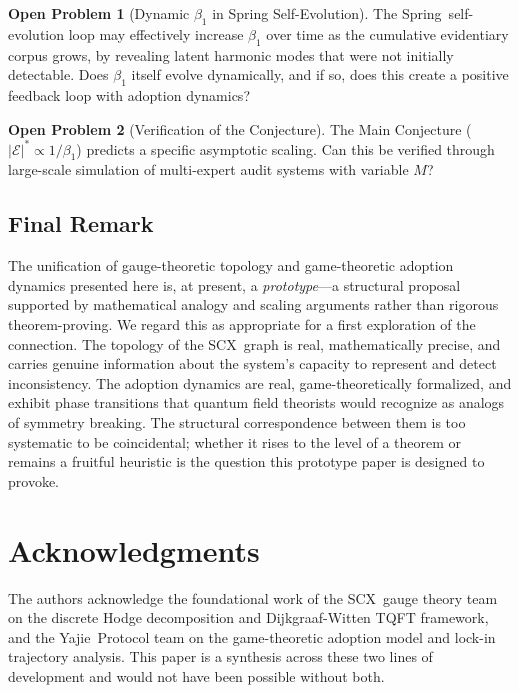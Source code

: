 \documentclass[12pt,a4paper]{article}
\theoremstyle{definition}
\newtheorem{problem}{Open Problem}[section]
\theoremstyle{remark}
\theoremstyle{definition}
\newcommand{\CEC}{\mathcal{E}}
\newcommand{\SCX}{\textsf{SCX}}
\newcommand{\Yajie}{\textsf{Yajie}}
\newcommand{\Spring}{\textsf{Spring}}
\newcommand{\CECstar}{|\CEC|^*}
\begin{document}
\begin{problem}[Dynamic $\beta_1$ in Spring Self-Evolution]
  The \Spring\ self-evolution loop may effectively increase $\beta_1$ over time as the cumulative evidentiary corpus grows, by revealing latent harmonic modes that were not initially detectable. Does $\beta_1$ itself evolve dynamically, and if so, does this create a positive feedback loop with adoption dynamics?
\end{problem}

\begin{problem}[Verification of the Conjecture]
  The Main Conjecture ($\CECstar \propto 1/\beta_1$) predicts a specific asymptotic scaling. Can this be verified through large-scale simulation of multi-expert audit systems with variable $M$?
\end{problem}

\subsection{Final Remark}

The unification of gauge-theoretic topology and game-theoretic adoption dynamics presented here is, at present, a \emph{prototype}---a structural proposal supported by mathematical analogy and scaling arguments rather than rigorous theorem-proving. We regard this as appropriate for a first exploration of the connection. The topology of the \SCX\ graph is real, mathematically precise, and carries genuine information about the system's capacity to represent and detect inconsistency. The adoption dynamics are real, game-theoretically formalized, and exhibit phase transitions that quantum field theorists would recognize as analogs of symmetry breaking. The structural correspondence between them is too systematic to be coincidental; whether it rises to the level of a theorem or remains a fruitful heuristic is the question this prototype paper is designed to provoke.

\section*{Acknowledgments}
The authors acknowledge the foundational work of the \SCX\ gauge theory team on the discrete Hodge decomposition and Dijkgraaf-Witten TQFT framework, and the \Yajie\ Protocol team on the game-theoretic adoption model and lock-in trajectory analysis. This paper is a synthesis across these two lines of development and would not have been possible without both.
\end{document}
